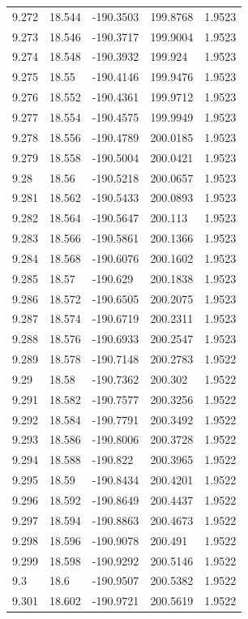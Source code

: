 \begin{tabular}{lllll}
9.272 & 18.544 & -190.3503 & 199.8768 & 1.9523 \\
9.273 & 18.546 & -190.3717 & 199.9004 & 1.9523 \\
9.274 & 18.548 & -190.3932 & 199.924 & 1.9523 \\
9.275 & 18.55 & -190.4146 & 199.9476 & 1.9523 \\
9.276 & 18.552 & -190.4361 & 199.9712 & 1.9523 \\
9.277 & 18.554 & -190.4575 & 199.9949 & 1.9523 \\
9.278 & 18.556 & -190.4789 & 200.0185 & 1.9523 \\
9.279 & 18.558 & -190.5004 & 200.0421 & 1.9523 \\
9.28 & 18.56 & -190.5218 & 200.0657 & 1.9523 \\
9.281 & 18.562 & -190.5433 & 200.0893 & 1.9523 \\
9.282 & 18.564 & -190.5647 & 200.113 & 1.9523 \\
9.283 & 18.566 & -190.5861 & 200.1366 & 1.9523 \\
9.284 & 18.568 & -190.6076 & 200.1602 & 1.9523 \\
9.285 & 18.57 & -190.629 & 200.1838 & 1.9523 \\
9.286 & 18.572 & -190.6505 & 200.2075 & 1.9523 \\
9.287 & 18.574 & -190.6719 & 200.2311 & 1.9523 \\
9.288 & 18.576 & -190.6933 & 200.2547 & 1.9523 \\
9.289 & 18.578 & -190.7148 & 200.2783 & 1.9522 \\
9.29 & 18.58 & -190.7362 & 200.302 & 1.9522 \\
9.291 & 18.582 & -190.7577 & 200.3256 & 1.9522 \\
9.292 & 18.584 & -190.7791 & 200.3492 & 1.9522 \\
9.293 & 18.586 & -190.8006 & 200.3728 & 1.9522 \\
9.294 & 18.588 & -190.822 & 200.3965 & 1.9522 \\
9.295 & 18.59 & -190.8434 & 200.4201 & 1.9522 \\
9.296 & 18.592 & -190.8649 & 200.4437 & 1.9522 \\
9.297 & 18.594 & -190.8863 & 200.4673 & 1.9522 \\
9.298 & 18.596 & -190.9078 & 200.491 & 1.9522 \\
9.299 & 18.598 & -190.9292 & 200.5146 & 1.9522 \\
9.3 & 18.6 & -190.9507 & 200.5382 & 1.9522 \\
9.301 & 18.602 & -190.9721 & 200.5619 & 1.9522 \\

\end{tabular}
